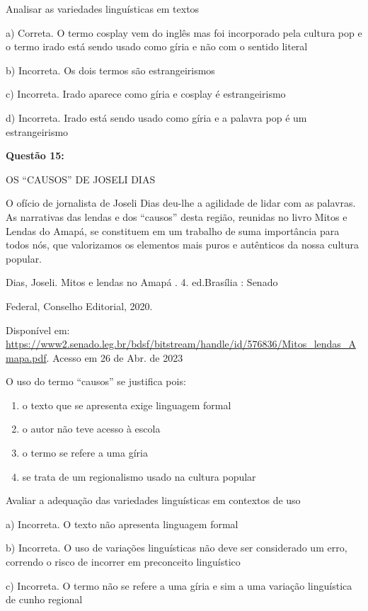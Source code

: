 Analisar as variedades linguísticas em textos

a) Correta. O termo cosplay vem do inglês mas foi incorporado pela
cultura pop e o termo irado está sendo usado como gíria e não com o
sentido literal

b) Incorreta. Os dois termos são estrangeirismos

c) Incorreta. Irado aparece como gíria e cosplay é estrangeirismo

d) Incorreta. Irado está sendo usado como gíria e a palavra pop é um
estrangeirismo

\textbf{Questão 15:}

OS ``CAUSOS'' DE JOSELI DIAS

O ofício de jornalista de Joseli Dias deu-lhe a agilidade de lidar com
as palavras. As narrativas das lendas e dos ``causos'' desta região,
reunidas no livro Mitos e Lendas do Amapá, se constituem em um trabalho
de suma importância para todos nós, que valorizamos os elementos mais
puros e autênticos da nossa cultura popular.

Dias, Joseli. Mitos e lendas no Amapá . 4. ed.Brasília : Senado

Federal, Conselho Editorial, 2020.

Disponível em:
\href{https://www2.senado.leg.br/bdsf/bitstream/handle/id/576836/Mitos_lendas_Amapa.pdf}{{https://www2.senado.leg.br/bdsf/bitstream/handle/id/576836/Mitos\_lendas\_Amapa.pdf}}.
Acesso em 26 de Abr. de 2023

O uso do termo ``causos'' se justifica pois:

\begin{enumerate}
\def\labelenumi{\alph{enumi})}
\item
  o texto que se apresenta exige linguagem formal
\item
  o autor não teve acesso à escola
\item
  o termo se refere a uma gíria
\item
  se trata de um regionalismo usado na cultura popular
\end{enumerate}

Avaliar a adequação das variedades linguísticas em contextos de uso

a) Incorreta. O texto não apresenta linguagem formal

b) Incorreta. O uso de variações linguísticas não deve ser considerado
um erro, correndo o risco de incorrer em preconceito linguístico

c) Incorreta. O termo não se refere a uma gíria e sim a uma variação
linguística de cunho regional

